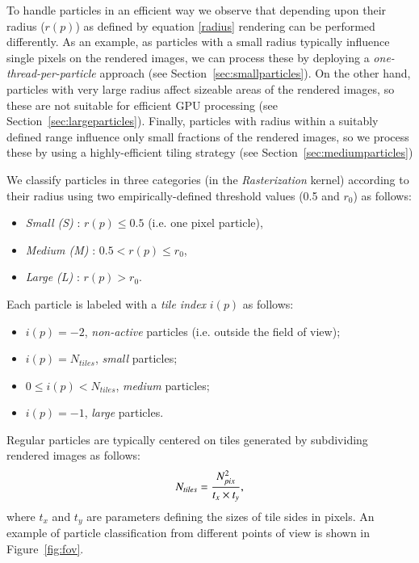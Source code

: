 \documentclass[1p]{elsarticle}
\begin{document}
To handle particles in an efficient way we observe that depending upon their radius ($r(p)$) as defined by equation \eqref{radius} rendering can be performed differently. As an example, as particles with a small radius typically influence single pixels on the rendered images, we can process these by deploying a {\it one-thread-per-particle} approach (see Section~\ref{sec:smallparticles}). On the other hand, particles with very large radius affect sizeable areas of the rendered images, so these are not suitable for efficient GPU processing (see Section~\ref{sec:largeparticles}). Finally, particles with radius within a suitably defined range influence only small fractions of the rendered images, so we process these by using a highly-efficient tiling strategy (see Section~\ref{sec:mediumparticles})

We classify particles in three categories (in the {\it Rasterization} kernel) according to their radius  using two empirically-defined threshold values (0.5 and $r_0$) as follows:

\begin{itemize}
\item
{\it Small (S)} : $r(p) \le 0.5$ (i.e. one pixel particle),
\item
{\it Medium (M)} : $0.5 < r(p) \le r_0$,
\item
{\it Large (L)} : $r(p) > r_0$.
\end{itemize}
Each particle is labeled with a {\it tile index} $i(p)$ as follows:
\begin{itemize}
\item
$i(p) = -2$, {\it non-active} particles (i.e. outside the field of view);
\item
$i(p) = N_{tiles}$, {\it small} particles;
\item
$0 \le i(p) < N_{tiles}$, {\it medium} particles;  
\item
$i(p) = -1$, {\it large} particles.
\end{itemize}

Regular particles are typically centered on tiles generated by subdividing rendered images as follows:
\begin{equation}
N_{tiles} = {N_{pix}^2\over t_x \times t_y},  
\end{equation}
where $t_x$ and $t_y$ are parameters defining the sizes of tile sides in pixels. 
An example of particle classification from different points of view is shown in Figure~\ref{fig:fov}.
\end{document}
